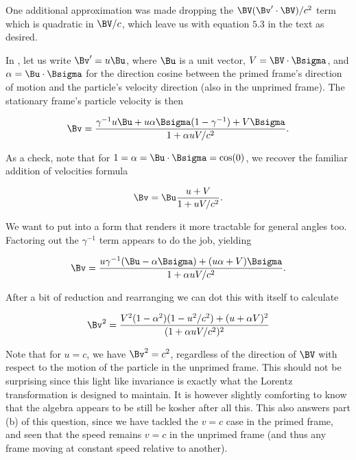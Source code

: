 {One additional approximation was made dropping the \(\BV (\Bv' \cdot \BV)/c^2\) term which is quadratic in \(\BV/c\), which leave us with equation \(5.3\) in the text as desired.



In , let us write \(\Bv' = u \Bu\), where \(\Bu\) is a unit vector, \(V = \BV \cdot \Bsigma\), and \(\alpha = \Bu \cdot \Bsigma\) for the direction cosine between the primed frame's direction of motion and the particle's velocity direction (also in the unprimed frame).  The stationary frame's particle velocity is then

\begin{equation}\label{eqn:relativisticElectrodynamicsA1:260}
\Bv = \frac{\gamma^{-1} u \Bu + u \alpha \Bsigma (1 - \gamma^{-1}) + V \Bsigma}{ 1 + \alpha u V/c^2 }.
\end{equation}

As a check, note that for \(1 = \alpha = \Bu \cdot \Bsigma = \cos(0)\), we recover the familiar addition of velocities formula 

\begin{equation}\label{eqn:relativisticElectrodynamicsA1:260b}
\Bv = \Bu \frac{u + V}{ 1 + u V/c^2 }.
\end{equation}

We want to put  into a form that renders it more tractable for general angles too.  Factoring out the \(\gamma^{-1}\) term appears to do the job, yielding

\begin{equation}\label{eqn:relativisticElectrodynamicsA1:260c}
\Bv = \frac{u \gamma^{-1} (\Bu -\alpha \Bsigma) + (u \alpha + V) \Bsigma}{ 1 + \alpha u V/c^2 }.
\end{equation}

After a bit of reduction and rearranging we can dot this with itself to calculate

\begin{equation}\label{eqn:relativisticElectrodynamicsA1:270}
\Bv^2 = \frac{V^2(1 - \alpha^2)(1 - u^2/c^2) + (u + \alpha V)^2}{ (1 + \alpha u V/c^2)^2 }
\end{equation}

Note that for \(u = c\), we have \(\Bv^2 = c^2\), regardless of the direction of \(\BV\) with respect to the motion of the particle in the unprimed frame.  This should not be surprising since this light like invariance is exactly what the Lorentz transformation is designed to maintain.  It is however slightly comforting to know that the algebra appears to be still be kosher after all this.  This also answers part (b) of this question, since we have tackled the \(v = c\) case in the primed frame, and seen that the speed remains \(v = c\) in the unprimed frame (and thus any frame moving at constant speed relative to another).

}
